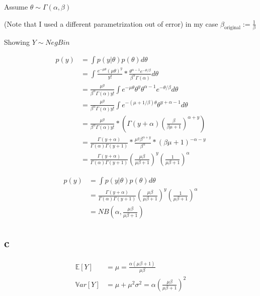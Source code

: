 \documentclass[]{article}
\begin{document}
Assume \(\theta \sim \Gamma(\alpha, \beta)\)

(Note that I used a different parametrization out of error) in my case
\(\beta_\text{original} := \frac{1}{\beta}\)

Showing \(Y \sim Neg Bin\)

\[
\begin{aligned}
p(y) &= \int p(y|\theta) p(\theta) d\theta\\
&= \int \frac{{e^{ - \mu\theta } (\mu\theta) ^y }}{{y!}}*\frac{ \theta^{\alpha-1}e^{-\theta / \beta}}{\beta^\alpha\Gamma(\alpha)} d\theta \\
&= \frac{\mu^y}{\beta^{\alpha} \Gamma(\alpha) y!} \int e^{-\mu\theta} \theta^{y} \theta^{\alpha-1} e^{- \theta / \beta} d\theta \\
&= \frac{\mu^y}{\beta^{\alpha}\Gamma(\alpha) y!} \int e^{-(\mu + 1/\beta)\theta} \theta^{y + \alpha -1} d\theta \\
&= \frac{\mu^y}{\beta^{\alpha}\Gamma(\alpha) y!} * \left(\Gamma(y + \alpha) (\frac{\beta}{\beta \mu + 1})^{\alpha + y} \right) \\
&= \frac{ \Gamma(y + \alpha)}{\Gamma(\alpha) \Gamma(y + 1)} * \frac{\mu^y\beta^{\alpha + y}}{\beta^{\alpha}} * \left( \beta\mu + 1 \right)^{-\alpha-y} \\
&= \frac{ \Gamma(y + \alpha)}{\Gamma(\alpha) \Gamma(y + 1)} \left( \frac{\mu \beta}{\mu \beta + 1} \right)^y \left( \frac{1}{\mu \beta + 1} \right)^\alpha
\end{aligned}
\]

\[
\begin{aligned}
p(y) &= \int p(y|\theta) p(\theta) d\theta\\
&= \frac{ \Gamma(y + \alpha)}{\Gamma(\alpha) \Gamma(y + 1)} \left( \frac{\mu \beta}{\mu \beta + 1} \right)^y \left( \frac{1}{\mu \beta + 1} \right)^\alpha \\
&= NB(\alpha, \frac{\mu \beta}{\mu \beta + 1})
\end{aligned}
\]

\hypertarget{c-1}{%
\subsection{c}\label{c-1}}

\[
\begin{aligned}
\mathbb{E}[Y] &= \mu = \frac{\alpha (\mu \beta + 1)}{\mu \beta} \\
\mathbb{V}ar[Y] &= \mu + \mu^2 \sigma^2 = \alpha (\frac{\mu \beta}{\mu \beta + 1})^2
\end{aligned}
\]
\end{document}
